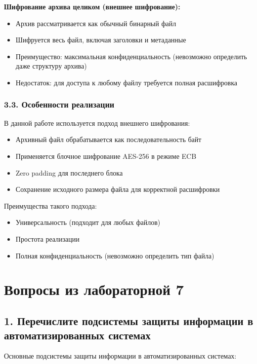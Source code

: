 \textbf{Шифрование архива целиком (внешнее шифрование):}
\begin{itemize}
    \item Архив рассматривается как обычный бинарный файл
    \item Шифруется весь файл, включая заголовки и метаданные
    \item Преимущество: максимальная конфиденциальность (невозможно определить даже структуру архива)
    \item Недостаток: для доступа к любому файлу требуется полная расшифровка
\end{itemize}

\subsubsection*{3.3. Особенности реализации}

В данной работе используется подход внешнего шифрования:
\begin{itemize}
    \item Архивный файл обрабатывается как последовательность байт
    \item Применяется блочное шифрование AES-256 в режиме ECB
    \item Zero padding для последнего блока
    \item Сохранение исходного размера файла для корректной расшифровки
\end{itemize}

Преимущества такого подхода:
\begin{itemize}
    \item Универсальность (подходит для любых файлов)
    \item Простота реализации
    \item Полная конфиденциальность (невозможно определить тип файла)
\end{itemize}

\section*{Вопросы из лабораторной 7}

\subsection*{1. Перечислите подсистемы защиты информации в автоматизированных системах}

Основные подсистемы защиты информации в автоматизированных системах:


